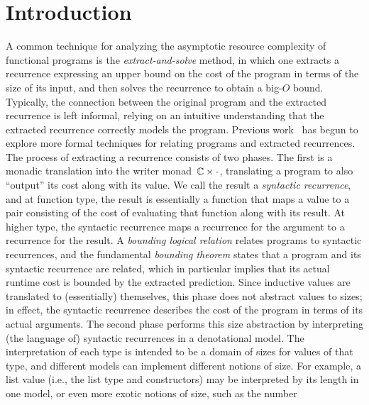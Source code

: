 
\section{Introduction}\label{sec:intro}

A common technique for analyzing the asymptotic resource
complexity of functional programs is the
\emph{extract-and-solve} method, in which one extracts a recurrence
expressing an upper bound on the cost of the program in terms of the size of
its input, and then solves the recurrence to obtain a big-$O$ bound.
Typically, the connection between the original program and the extracted
recurrence is left informal, relying on an intuitive understanding that the
extracted recurrence correctly models the program.  Previous
work~\cite{danner-et-al:plpv13,danner-et-al:icfp15,hudson,kavvos-et-al:popl20,
danner-licata:jfp-in-prep} has begun to explore more formal techniques for
relating programs and extracted recurrences.  The process of extracting a
recurrence consists of two phases.  The first is a monadic translation into
the writer monad~$\mathbb{C}\times\cdot$, translating a program to also
``output'' its cost along with its value.  We call the result a
\emph{syntactic recurrence}, and at function type, the result is essentially
a function that maps a value to a pair consisting of the cost of evaluating
that function along with its result.  At higher type, the syntactic
recurrence maps a recurrence for the argument to a recurrence for the
result.  A \emph{bounding logical relation} relates programs to syntactic
recurrences, and the fundamental \emph{bounding theorem} states that a
program and its syntactic recurrence are related, which in particular
implies that its actual runtime cost is bounded by the extracted prediction.
Since inductive values are translated to (essentially) themselves, this
phase does not abstract values to sizes; in effect, the syntactic recurrence
describes the cost of the program in terms of its actual arguments.  The
second phase performs this size abstraction by interpreting (the language
of) syntactic recurrences in a denotational model.  The interpretation of
each type is intended to be a domain of sizes for values of that type, and
different models can implement different notions of size.  For example, a
list value (i.e., the list type and constructors) may be interpreted by its
length in one model, or even more exotic notions of size, such as the number
